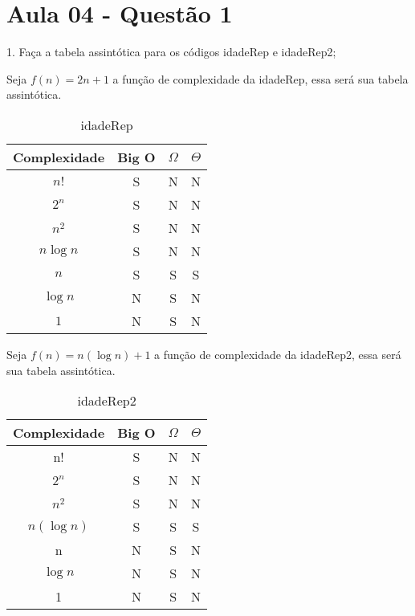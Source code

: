 \section{Aula 04 - Questão 1}

1. Faça a tabela assintótica para os códigos idadeRep e idadeRep2;

Seja $f(n) = 2n + 1$ a função de complexidade da idadeRep, essa será sua tabela assintótica. 

\begin{table}[ht!]
    \centering
    \begin{tabular}{|c|c|c|c|}
    \hline
    \textbf{Complexidade} & \textbf{Big O} & $\Omega$ & $\Theta$ \\ \hline
    $n!$ & S & N & N \\ \hline
    $2^n$ & S & N & N \\ \hline
    $n^2$ & S & N & N \\ \hline
    $n\log n$ & S & N & N \\ \hline
    $n$ & S & S & S \\ \hline
    $\log n$ & N & S & N \\ \hline
    $1$ & N & S & N \\ \hline 
    \end{tabular}
    \caption{idadeRep}
\end{table}

Seja $f(n) = n(\log n) + 1$ a função de complexidade da idadeRep2, essa será sua tabela assintótica. 

\begin{table}[ht!]
    \centering
    \begin{tabular}{|c|c|c|c|}
    \hline
    \textbf{Complexidade} & \textbf{Big O} & $\Omega$ & $\Theta$ \\ \hline
    n! & S & N & N \\ \hline
    $2^n$ & S & N & N \\ \hline
    $n^2$ & S & N & N \\ \hline
    $n(\log n)$ & S & S & S \\ \hline
    n & N & S & N \\ \hline
    $\log n$ & N & S & N \\ \hline
    1 & N & S & N \\ \hline 
    \end{tabular}
    \caption{idadeRep2}
\end{table}